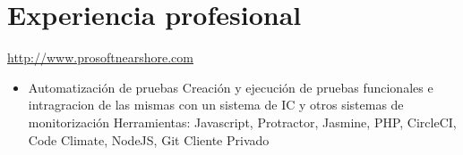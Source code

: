 \documentclass[11pt,a4paper]{moderncv}
\begin{document}
\section{Experiencia profesional}
{
    \url{http://www.prosoftnearshore.com}
    \begin{itemize}
        \item Automatización de pruebas
            \newline{}
            Creación y ejecución de pruebas funcionales e intragracion de las mismas con un sistema de IC y otros sistemas de monitorización
            \newline{}
            Herramientas: Javascript, Protractor, Jasmine, PHP, CircleCI, Code Climate, NodeJS, Git
            \newline{}
            Cliente Privado
            \newline{}
    \end{itemize}
}
\end{document}
